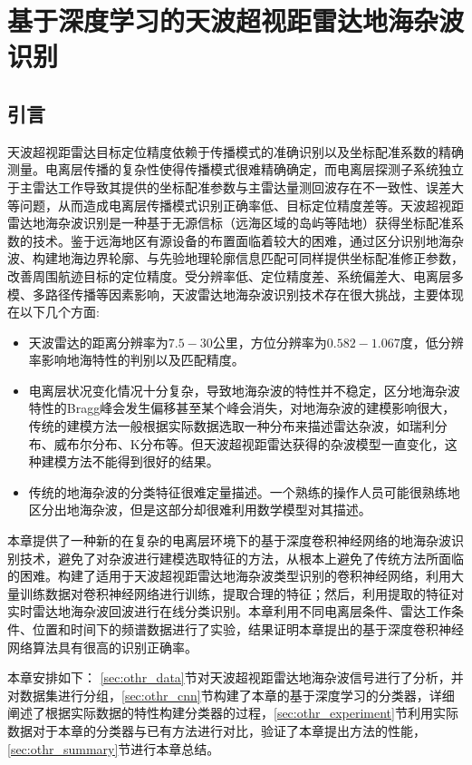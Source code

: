 \chapter{基于深度学习的天波超视距雷达地海杂波识别}
\label{sec:othr}
\section{引言}

天波超视距雷达目标定位精度依赖于传播模式的准确识别以及坐标配准系数的精确测量。电离层传播的复杂性使得传播模式很难精确确定，而电离层探测子系统独立于主雷达工作导致其提供的坐标配准参数与主雷达量测回波存在不一致性、误差大等问题，从而造成电离层传播模式识别正确率低、目标定位精度差等。天波超视距雷达地海杂波识别是一种基于无源信标（远海区域的岛屿等陆地）获得坐标配准系数的技术。鉴于远海地区有源设备的布置面临着较大的困难，通过区分识别地海杂波、构建地海边界轮廓、与先验地理轮廓信息匹配可同样提供坐标配准修正参数，改善周围航迹目标的定位精度。受分辨率低、定位精度差、系统偏差大、电离层多模、多路径传播等因素影响，天波雷达地海杂波识别技术存在很大挑战，主要体现在以下几个方面:
\begin{itemize}
	\item 天波雷达的距离分辨率为$7.5-30$公里，方位分辨率为$0.582-1.067$度，低分辨率影响地海特性的判别以及匹配精度。
	\item 电离层状况变化情况十分复杂，导致地海杂波的特性并不稳定，区分地海杂波特性的Bragg峰会发生偏移甚至某个峰会消失，对地海杂波的建模影响很大，传统的建模方法一般根据实际数据选取一种分布来描述雷达杂波，如瑞利分布、威布尔分布、K分布等。但天波超视距雷达获得的杂波模型一直变化，这种建模方法不能得到很好的结果。
	\item 传统的地海杂波的分类特征很难定量描述。一个熟练的操作人员可能很熟练地区分出地海杂波，但是这部分却很难利用数学模型对其描述。
\end{itemize}

本章提供了一种新的在复杂的电离层环境下的基于深度卷积神经网络的地海杂波识别技术，避免了对杂波进行建模选取特征的方法，从根本上避免了传统方法所面临的困难。构建了适用于天波超视距雷达地海杂波类型识别的卷积神经网络，利用大量训练数据对卷积神经网络进行训练，提取合理的特征；然后，利用提取的特征对实时雷达地海杂波回波进行在线分类识别。本章利用不同电离层条件、雷达工作条件、位置和时间下的频谱数据进行了实验，结果证明本章提出的基于深度卷积神经网络算法具有很高的识别正确率。

本章安排如下： \ref{sec:othr_data}节对天波超视距雷达地海杂波信号进行了分析，并对数据集进行分组，\ref{sec:othr_cnn}节构建了本章的基于深度学习的分类器，详细阐述了根据实际数据的特性构建分类器的过程，\ref{sec:othr_experiment}节利用实际数据对于本章的分类器与已有方法进行对比，验证了本章提出方法的性能，\ref{sec:othr_summary}节进行本章总结。

